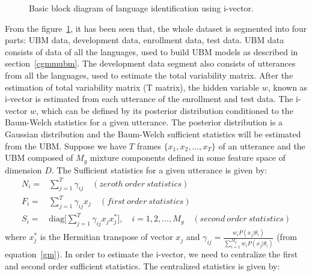 \begin{spacing}{1.5}
\begin{figure}[h]
\caption{Basic block diagram of language identification using i-vector.}
\label{i-vec}
\end{figure}
From the figure~\ref{i-vec}, it has been seen that, the whole dataset is segmented into four parts: UBM data, development data, enrollment data, test data. UBM data consists of data of all the languages, used to build UBM models as described in section~\ref{cgmmubm}. The development data segment also consists of utterances from all the languages, used to estimate the total variability matrix. After the estimation of total variability matrix (T matrix), the hidden variable $w$, known as i-vector is estimated from each utterance of the enrollment and test data. The i-vector $w$, which can be defined by its posterior distribution conditioned to the Baum-Welch statistics for a given utterance. The posterior distribution is a Gaussian distribution and the Baum-Welch sufficient statistics will be estimated from the UBM. Suppose we have $T$ frames $\{x_{1}, x_{2}, \ldots, x_{T}\}$ of an utterance and the UBM composed of $M_{g}$ mixture components defined in some feature space of dimension $D$. The Sufficient statistics for a given utterance is given by:
\begin{equation}
    \begin{aligned}
     N_{i}=&\sum_{j=1}^{T}\gamma_{ij} \quad (zeroth ~order ~statistics)\\
     F_{i}=&\sum_{j=1}^{T}\gamma_{ij}x_{j} \quad (first ~order ~statistics)\\
     S_{i}=&\mbox{diag}\Bigg[\sum_{j=1}^{T}\gamma_{ij}x_{j}x_{j}^{*}\Bigg], \quad i=1,2,\ldots,M_{g} \quad (second ~order ~statistics)
    \end{aligned}
\end{equation}
where $x_{j}^{*}$ is the Hermitian transpose of vector $x_{j}$ and $\gamma_{ij}=\frac{w_{i}P(x_{j}|\theta_{i})}{{\sum_{i=1}^{M_{g}} w_{i}P(x_{j}|\theta_{i})}}$ (from equation~\ref{gm}).  In order to estimate the i-vector, we need to centralize the first and second order sufficient statistics. The centralized statistics is given by:

\end{spacing}
